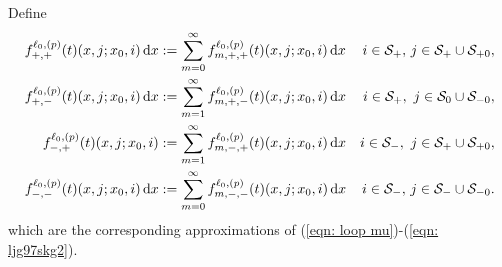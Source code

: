 Define
\begin{align*}
		f^{\ell_0,(p)}_{+,+}(t)(x,j;x_0,i)\, \mathrm{d} x &:= \sum_{m=0}^\infty f^{\ell_0,(p)}_{m,+,+}(t)(x,j;x_0,i)\, \mathrm{d} x & i\in\mathcal{S}_+,\,j\in\mathcal{S}_+\cup\mathcal{S}_{+0},
		\\ f^{\ell_0,(p)}_{+,-}(t)(x,j;x_0,i)\, \mathrm{d} x &:= \sum_{m=1}^\infty f^{\ell_0,(p)}_{m,+,-}(t)(x,j;x_0,i)\, \mathrm{d} x & i\in\mathcal S_+,\,\,j\in\mathcal S_{0}\cup\mathcal{S}_{-0},
		\\ f^{\ell_0,(p)}_{-,+}(t)(x,j;x_0,i) &:= \sum_{m=1}^\infty f^{\ell_0,(p)}_{m,-,+}(t)(x,j;x_0,i)\, \mathrm{d} x & i\in\mathcal S_-,\,\,j\in\mathcal S_{+}\cup\mathcal{S}_{+0},
		\\ f^{\ell_0,(p)}_{-,-}(t)(x,j;x_0,i)\, \mathrm{d} x &:= \sum_{m=0}^\infty f^{\ell_0,(p)}_{m,-,-}(t)(x,j;x_0,i)\, \mathrm{d} x & i\in\mathcal{S}_-,\,j\in\mathcal S_-\cup\mathcal{S}_{-0}.
\end{align*}
which are the corresponding approximations of (\ref{eqn: loop mu})-(\ref{eqn: ljg97skg2}).
